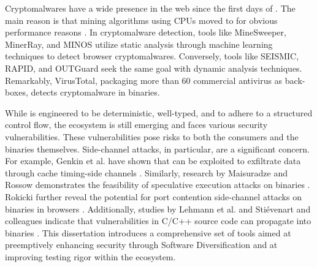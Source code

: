  Cryptomalwares have a wide presence in the web since the first days of \wasm.
The main reason is that mining algorithms using CPUs moved to \wasm for obvious performance reasons \cite{musch2019new}. 
In cryptomalware detection, tools like MineSweeper\cite{Minesweeper}, MinerRay\cite{MinerRay}, and MINOS\cite{MINOS} utilize static analysis through machine learning techniques to detect browser cryptomalwares. 
Conversely, tools like SEISMIC\cite{SEISMIC}, RAPID\cite{RAPID}, and OUTGuard\cite{outguard} seek the same goal with dynamic analysis techniques.
Remarkably, VirusTotal, packaging more than 60 commercial antivirus as back-boxes, detects cryptomalware in \wasm binaries.




While \Wasm is engineered to be deterministic, well-typed, and to adhere to a structured control flow, the ecosystem is still emerging and faces various security vulnerabilities. 
These vulnerabilities pose risks to both the consumers and the \Wasm binaries themselves. 
Side-channel attacks, in particular, are a significant concern. 
For example, Genkin et al. have shown that \Wasm can be exploited to exfiltrate data through cache timing-side channels \cite{Genkin2018DrivebyKC}. 
Similarly, research by Maisuradze and Rossow demonstrates the feasibility of speculative execution attacks on \Wasm binaries \cite{ret2spec}. 
Rokicki \etal further reveal the potential for port contention side-channel attacks on \Wasm binaries in browsers \cite{10.1145/3488932.3517411}.
Additionally, studies by Lehmann et al. and Stiévenart and colleagues indicate that vulnerabilities in C/C++ source code can propagate into \Wasm binaries \cite{usenixWasm2020, DeRoover2022}. 
This dissertation introduces a comprehensive set of tools aimed at preemptively enhancing \Wasm security through Software Diversification and at improving testing rigor within the ecosystem.

